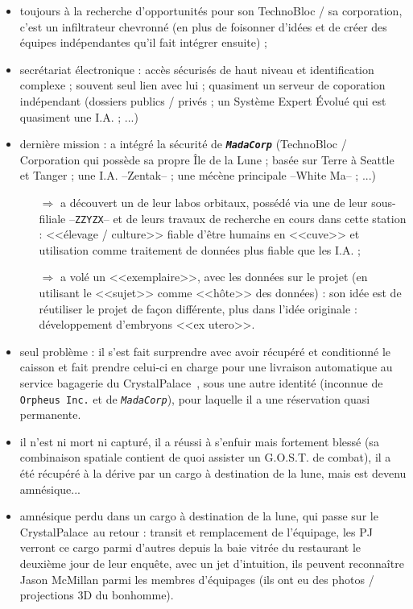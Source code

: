 \documentclass[11pt,twoside,a4paper]{article}
\begin{document}
\begin{itemize}
	\item toujours {\`a} la recherche d'opportunit{\'e}s pour son TechnoBloc / sa corporation, c'est un infiltrateur chevronn{\'e} (en plus de foisonner d'id{\'e}es et de cr{\'e}er des {\'e}quipes ind{\'e}pendantes qu'il fait int{\'e}grer ensuite) ; 
	\item secr{\'e}tariat {\'e}lectronique : acc{\`e}s s{\'e}curis{\'e}s de haut niveau et identification complexe ; souvent seul lien avec lui ; quasiment un serveur de coporation ind{\'e}pendant (dossiers publics / priv{\'e}s ; un Syst{\`e}me Expert {\'E}volu{\'e} qui est quasiment une I.A. ; ...)
	\item derni{\`e}re mission : a int{\'e}gr{\'e} la s{\'e}curit{\'e} de \textbf{\emph{\texttt{\emph{MadaCorp}}}} (TechnoBloc / Corporation qui poss{\`e}de sa propre {\^I}le de la Lune ; bas{\'e}e sur Terre {\`a} Seattle et Tanger ; une I.A. --Zentak-- ; une m{\'e}c{\`e}ne principale --White Ma-- ; ...)
	\begin{itemize}
		\item[$\Rightarrow$] a d{\'e}couvert un de leur labos orbitaux, poss{\'e}d{\'e} via une de leur sous-filiale --\texttt{ZZYZX}-- et de leurs travaux de recherche en cours dans cette station : <<{\'e}levage / culture>> fiable d'{\^e}tre humains en <<cuve>> et utilisation comme traitement de donn{\'e}es plus fiable que les I.A. ; 
		\item[$\Rightarrow$] a vol{\'e} un <<exemplaire>>, avec les donn{\'e}es sur le projet (en utilisant le <<sujet>> comme <<h{\^o}te>> des donn{\'e}es) : son id{\'e}e est de r{\'e}utiliser le projet de fa\c{c}on diff{\'e}rente, plus dans l'id{\'e}e originale : d{\'e}veloppement d'embryons <<ex utero>>. 
	\end{itemize}
	\item seul probl{\`e}me : il s'est fait surprendre avec avoir r{\'e}cup{\'e}r{\'e} et conditionn{\'e} le caisson et fait prendre celui-ci en charge pour une livraison automatique au service bagagerie du CrystalPalace~\texttrademark, sous une autre identit{\'e} (inconnue de \texttt{Orpheus Inc.} et de \texttt{\emph{MadaCorp}}), pour laquelle il a une r{\'e}servation quasi permanente. 
	\item il n'est ni mort ni captur{\'e}, il a r{\'e}ussi {\`a} s'enfuir mais fortement bless{\'e} (sa combinaison spatiale contient de quoi assister un G.O.S.T. de combat), il a {\'e}t{\'e} r{\'e}cup{\'e}r{\'e} {\`a} la d{\'e}rive par un cargo {\`a} destination de la lune, mais est devenu amn{\'e}sique... 
	\item amn{\'e}sique perdu dans un cargo {\`a} destination de la lune, qui passe sur le CrystalPalace~\texttrademark au retour : transit et remplacement de l'{\'e}quipage, les PJ verront ce cargo parmi d'autres depuis la baie vitr{\'e}e du restaurant le deuxi{\`e}me jour de leur enqu{\^e}te, avec un jet d'intuition, ils peuvent reconna{\^i}tre Jason McMillan parmi les membres d'{\'e}quipages (ils ont eu des photos / projections 3D du bonhomme). 
\end{itemize}
\end{document}

